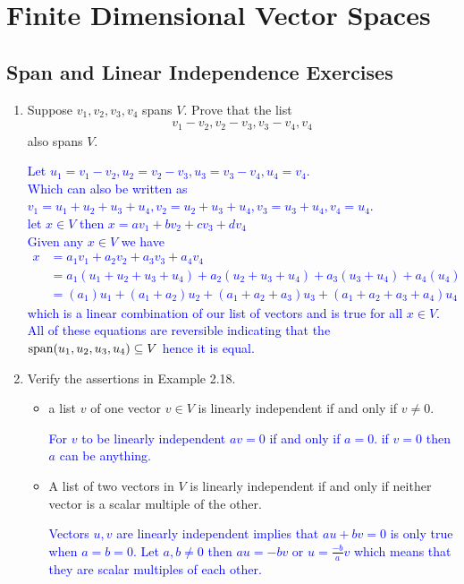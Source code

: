 \documentclass[10pt,a4paper]{report}
\newcommand{\BLUE}[1]{\textcolor{blue}{#1}}
\begin{document}
\chapter{Finite Dimensional Vector Spaces}

\section{Span and Linear Independence Exercises}

\begin{enumerate}

\item Suppose $v_1,v_2,v_3,v_4$ spans $V$.  Prove that the list 
\begin{align*}
	v_1-v_2,v_2-v_3,v_3-v_4,v_4
\end{align*}also spans $V$.

\BLUE{Let $u_1=v_1-v_2,u_2=v_2-v_3,u_3=v_3-v_4,u_4=v_4$.  \\
Which can also be written as $v_1=u_1+u_2+u_3+u_4,v_2=u_2+u_3+u_4,v_3=u_3+u_4,v_4 = u_4$.  \\
let $x \in V$ then $x = av_1+bv_2+cv_3+dv_4$\\
Given any $x \in V$ we have 
\begin{align*}
	x&=a_1v_1+a_2v_2+a_3v_3+a_4v_4 \\
	&= a_1(u_1+u_2+u_3+u_4)+a_2(u_2+u_3+u_4)+a_3(u_3+u_4)+a_4(u_4) \\
	&= (a_1)u_1+(a_1+a_2)u_2+(a_1+a_2+a_3)u_3+(a_1+a_2+a_3+a_4)u_4
\end{align*}which is a linear combination of our list of vectors and is true for all $x \in V$. All of these equations are reversible indicating that the $\operatorname{span}(u_1, u_2, u_3, u_4) \subseteq V$ hence it is equal.
}

\item Verify the assertions in Example 2.18.

\begin{itemize}
	\item a list $v$ of one vector $v \in V$ is linearly independent if and only if $v \ne 0$.
	
	\BLUE{For $v$ to be linearly independent $av=0$ if and only if $a=0$. if $v=0$ then $a$ can be anything.
	}
	
	\item A list of two vectors in $V$ is linearly independent if and only if neither vector is a scalar multiple of the other.
	
	\BLUE{Vectors $u,v$ are linearly independent implies that $au+bv=0$ is only true when $a = b = 0$.  Let $a, b \ne 0$ then $au=-bv$ or $u=\frac{-b}{a}v$ which means that they are scalar multiples of each other.
	}
	

\end{itemize}
\end{enumerate}
\end{document}
